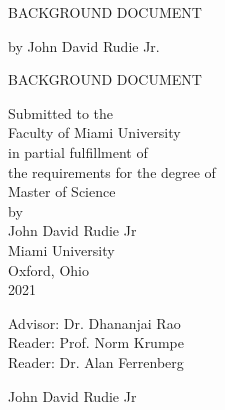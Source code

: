 \documentclass[12pt, oneside]{book2}
\begin{document}
\thispagestyle{empty}
\singlespacing

\begin{center}

\vspace{2.0cm}
BACKGROUND DOCUMENT
\vspace{1.0cm}

by John David Rudie Jr.

\vspace{1.0cm}
\end{center}


\newpage

\thispagestyle{empty}

\frontmatter

\doublespacing

\begin{titlepage}
\begin{center}
BACKGROUND DOCUMENT

\vspace{1.5cm}


\vspace{0.5cm}

Submitted to the \\
Faculty of Miami University \\
in partial fulfillment of \\
the requirements for the degree of \\
Master of Science \\
by \\
John David Rudie Jr \\
Miami University \\
Oxford, Ohio \\
2021

\vspace{1.5cm}

Advisor: Dr. Dhananjai Rao\\
Reader: Prof. Norm Krumpe\\
Reader: Dr. Alan Ferrenberg\\


\vspace{1.5cm}

 John David Rudie Jr

\end{center}

\end{titlepage}

\singlespacing
\setcounter{page}{3}
\tableofcontents
\setcounter{tocdepth}{2}
\cleardoublepage
{}
\listoftables
\cleardoublepage
{}
\listoffigures

\newpage


\mainmatter





\backmatter



\end{document}
